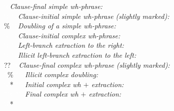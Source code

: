 \begin{exe}
\ex\label{overvieswhtypes}
\begin{xlist}
\ex \textcolor{white}{\%}\textit{Clause-final simple \textit{wh}-phrase:}\\
\textcolor{white}{\%}
\label{overvieswhtypesa}
\ex \textcolor{white}{\%}\textit{Clause-initial simple \textit{wh}-phrase (slightly marked):}\\
\%
\label{overvieswhtypesb}
\ex \textcolor{white}{\%}\textit{Doubling of a simple \textit{wh}-phrase:}\\
\textcolor{white}{\%}
\label{overvieswhtypesc}
\ex \textcolor{white}{\%}\textit{Clause-initial complex \textit{wh}-phrase:}\\
\textcolor{white}{\%}
\label{overvieswhtypesd}
\ex \textcolor{white}{\%}\textit{Left-branch extraction to the right:}\\
\textcolor{white}{\%}
\label{overvieswhtypese}
\ex \textcolor{white}{\%}\textit{Illicit left-branch extraction to the left:}\\
??
\label{overvieswhtypesf}
\ex \textcolor{white}{\%}\textit{Clause-final complex \textit{wh}-phrase (slightly marked):}\\
\textcolor{white}{*}\%
\label{overvieswhtypesg}
\ex \textcolor{white}{*\%}\textit{Illicit complex doubling:} \\
\textcolor{white}{\%}*
\label{overvieswhtypesh}
\ex \textcolor{white}{*\%}\textit{Initial complex \textit{wh} $+$ extraction:} \\
\textcolor{white}{*\%}
\label{overvieswhtypesi}
\ex \textcolor{white}{*\%}\textit{Final complex \textit{wh} $+$ extraction:} \\
\textcolor{white}{\%}*
\label{overvieswhtypesj}

\end{xlist}

\end{exe}

